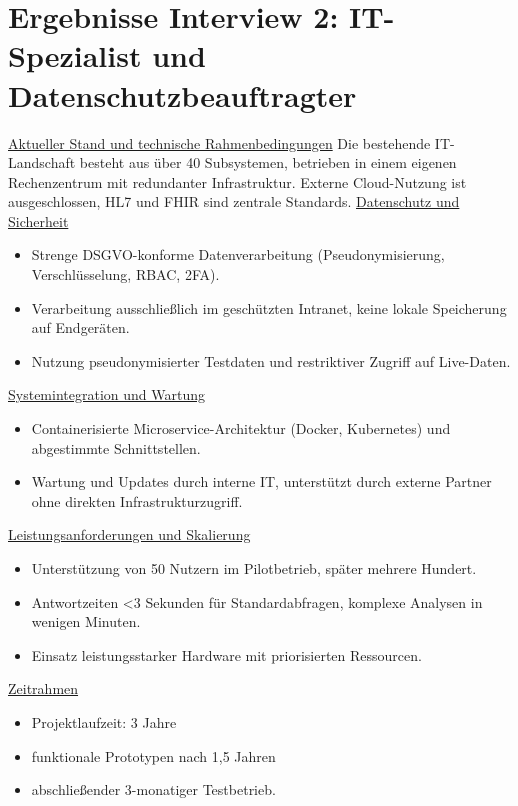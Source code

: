 \section{Ergebnisse Interview 2: IT-Spezialist und Datenschutzbeauftragter}
\underline{Aktueller Stand und technische Rahmenbedingungen}
Die bestehende IT-Landschaft besteht aus über 40 Subsystemen, betrieben in einem eigenen Rechenzentrum mit redundanter Infrastruktur. Externe Cloud-Nutzung ist ausgeschlossen, HL7 und FHIR sind zentrale Standards.
\underline{Datenschutz und Sicherheit}
\begin{itemize}
	\item Strenge DSGVO-konforme Datenverarbeitung (Pseudonymisierung, Verschlüsselung, RBAC, 2FA).
	\item Verarbeitung ausschließlich im geschützten Intranet, keine lokale Speicherung auf Endgeräten.
	\item Nutzung pseudonymisierter Testdaten und restriktiver Zugriff auf Live-Daten.
\end{itemize}
\underline{Systemintegration und Wartung}
\begin{itemize}
	\item Containerisierte Microservice-Architektur (Docker, Kubernetes) und abgestimmte Schnittstellen.
	\item Wartung und Updates durch interne IT, unterstützt durch externe Partner ohne direkten Infrastrukturzugriff.
\end{itemize}
\underline{Leistungsanforderungen und Skalierung}
\begin{itemize}
	\item Unterstützung von 50 Nutzern im Pilotbetrieb, später mehrere Hundert.
	\item Antwortzeiten <3 Sekunden für Standardabfragen, komplexe Analysen in wenigen Minuten.
	\item Einsatz leistungsstarker Hardware mit priorisierten Ressourcen.
\end{itemize}
\underline{Zeitrahmen}
\begin{itemize}
	\item Projektlaufzeit: 3 Jahre
	\item funktionale Prototypen nach 1,5 Jahren
	\item abschließender 3-monatiger Testbetrieb.
\end{itemize}
